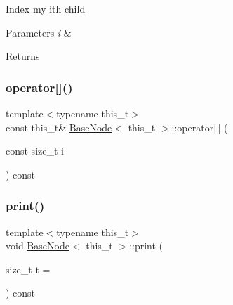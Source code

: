 Index my i\textquotesingle{}th child 
\begin{DoxyParams}{Parameters}
{\em i} & \\
\hline
\end{DoxyParams}
\begin{DoxyReturn}{Returns}

\end{DoxyReturn}
\mbox{\label{class_base_node_ad09bee05b19581e8827bdd03a31791a7}} 
\subsubsection{\texorpdfstring{operator[]()}{operator[]()}\hspace{0.1cm}{\footnotesize\ttfamily [2/2]}}
{\footnotesize\ttfamily template$<$typename this\+\_\+t$>$ \\
const this\+\_\+t\& \hyperlink{class_base_node}{Base\+Node}$<$ this\+\_\+t $>$\+::operator\mbox{[}$\,$\mbox{]} (\begin{DoxyParamCaption}\item[{const size\+\_\+t}]{i }\end{DoxyParamCaption}) const\hspace{0.3cm}{\ttfamily [inline]}}

\mbox{\label{class_base_node_acbfcc951fe5858d0c85a5b3dc8843f05}} 
\subsubsection{\texorpdfstring{print()}{print()}}
{\footnotesize\ttfamily template$<$typename this\+\_\+t$>$ \\
void \hyperlink{class_base_node}{Base\+Node}$<$ this\+\_\+t $>$\+::print (\begin{DoxyParamCaption}\item[{size\+\_\+t}]{t = {} }\end{DoxyParamCaption}) const\hspace{0.3cm}{\ttfamily [inline]}}

\mbox{\label{class_base_node_ab5a808e3ec22f8061022f9ec286d4a03}} 
